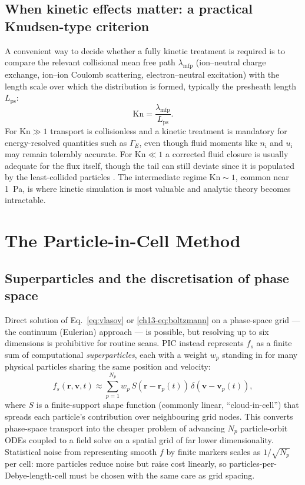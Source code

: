 \subsection{When kinetic effects matter: a practical Knudsen-type criterion}

A convenient way to decide whether a fully kinetic treatment is required is to compare the relevant collisional mean free path $\lambda_{\mathrm{mfp}}$ (ion--neutral charge exchange, ion--ion Coulomb scattering, electron--neutral excitation) with the length scale over which the distribution is formed, typically the presheath length $L_{\mathrm{ps}}$:
\begin{equation}
\mathrm{Kn} = \frac{\lambda_{\mathrm{mfp}}}{L_{\mathrm{ps}}}.
\end{equation}
For $\mathrm{Kn} \gg 1$ transport is collisionless and a kinetic treatment is mandatory for energy-resolved quantities such as $\Gamma_{E}$, even though fluid moments like $n_{\mathrm{i}}$ and $u_{\mathrm{i}}$ may remain tolerably accurate. For $\mathrm{Kn}\ll 1$ a corrected fluid closure is usually adequate for the flux itself, though the tail can still deviate since it is populated by the least-collided particles \cite{ref0672}. The intermediate regime $\mathrm{Kn}\sim 1$, common near \SI{1}{\pascal}, is where kinetic simulation is most valuable and analytic theory becomes intractable.

\section{The Particle-in-Cell Method}

\subsection{Superparticles and the discretisation of phase space}

Direct solution of Eq.~\eqref{eq:vlasov} or \eqref{ch13-eq:boltzmann} on a phase-space grid --- the continuum (Eulerian) approach --- is possible, but resolving up to six dimensions is prohibitive for routine scans. PIC instead represents $f_{s}$ as a finite sum of computational \emph{superparticles}, each with a weight $w_{p}$ standing in for many physical particles sharing the same position and velocity:
\begin{equation}
f_{s}(\mathbf{r},\mathbf{v},t) \approx \sum_{p=1}^{N_{p}} w_{p}\, S(\mathbf{r}-\mathbf{r}_{p}(t))\, \delta(\mathbf{v}-\mathbf{v}_{p}(t)),
\end{equation}
where $S$ is a finite-support shape function (commonly linear, ``cloud-in-cell'') that spreads each particle's contribution over neighbouring grid nodes. This converts phase-space transport into the cheaper problem of advancing $N_{p}$ particle-orbit ODEs coupled to a field solve on a spatial grid of far lower dimensionality. Statistical noise from representing smooth $f$ by finite markers scales as $1/\sqrt{N_{p}}$ per cell: more particles reduce noise but raise cost linearly, so particles-per-Debye-length-cell must be chosen with the same care as grid spacing.

